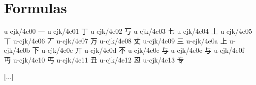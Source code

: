 
\FPmul{}%
\FPmul{}\begin{multicols}{2}\end{multicols}
\section{Formulas
}
\begin{multicols}{2}\begingroup\mktsStyleCode{}\begingroup\mktsObeyAllLines{}u-cjk/4e00	{\cjk{}一}	 
u-cjk/4e01	{\cjk{}丁}	 
u-cjk/4e02	{\cjk{}丂}	 
u-cjk/4e03	{\cjk{}七}	 
u-cjk/4e04	{\cjk{}丄}	 
u-cjk/4e05	{\cjk{}丅}	 
u-cjk/4e06	{\cjk{}丆}	 
u-cjk/4e07	{\cjk{}万}	 
u-cjk/4e08	{\cjk{}丈}	 
u-cjk/4e09	{\cjk{}三}	 
u-cjk/4e0a	{\cjk{}上}	 
u-cjk/4e0b	{\cjk{}下}	 
u-cjk/4e0c	{\cjk{}丌}	 
u-cjk/4e0d	{\cjk{}不}	 
u-cjk/4e0e	{\cjk{}与}	 
u-cjk/4e0e	{\cjk{}与}	 
u-cjk/4e0f	{\cjk{}丏}	 
u-cjk/4e10	{\cjk{}丐}	 
u-cjk/4e11	{\cjk{}丑}	 
u-cjk/4e12	{\cjk{}丒}	 
u-cjk/4e13	{\cjk{}专}	 
 
[...] 
 

\end{multicols}
